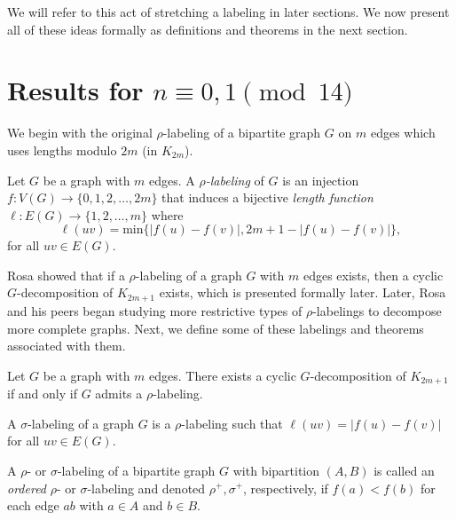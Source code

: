   We will refer to this act of stretching a labeling in later sections. We now present all of these ideas formally as definitions and theorems in the next section.
  
  
\section{Results for $n\equiv 0,1 \pmod{14}$}\label{sec:0,1results}

We begin with the original $\rho$-labeling of a bipartite graph $G$ on $m$ edges which uses lengths modulo $2m$ (in $K_{2m}$). 

\begin{definition} \label{def:rho} 
 Let $G$ be a graph with $m$ edges.  A \textit{$\rho$-labeling} of $G$ is an injection $f: V(G) \rightarrow \{0,1,2, \dots, 2m\}$ that induces a bijective \textit{length function $\ell: E(G) \rightarrow \{1,2, \dots, m\}$} where 
    $$
    \ell(uv) = \text{min}\{|f(u)-f(v)|,2m+1-|f(u)-f(v)|\},
    $$
for all  $uv \in E(G)$.
\end{definition}

Rosa showed that if a $\rho$-labeling of a graph $G$ with $m$ edges exists, then a cyclic $G$-decomposition of $K_{2m+1}$ exists, which is presented formally later. Later, Rosa and his peers began studying more restrictive types of $\rho$-labelings to decompose more complete graphs. Next, we define some of these labelings and theorems associated with them.

\begin{thm}\label{thm:Rhosa}  
Let $G$ be a graph with $m$ edges.  There exists a cyclic $G$-decomposition of $K_{2m+1}$ if and only if $G$ admits a $\rho$-labeling.
\end{thm}

\begin{definition} \label{def:sigma} 
A $\sigma$-labeling of a graph $G$ is a $\rho$-labeling such that $\ell(uv) = |f(u) - f(v)|$ for all $uv \in E(G).$
\end{definition}

\begin{definition} \label{def:rho and sigma ordered def} 
A $\rho$- or $\sigma$-labeling of a bipartite graph $G$ with bipartition $(A,B)$ is called an \emph{ordered} $\rho$- or $\sigma$-labeling and denoted $\rho^+,\sigma^+$, respectively, if $f(a) < f(b)$ for each edge $ab$ with $a \in A$ and $b \in B$.
\end{definition}

